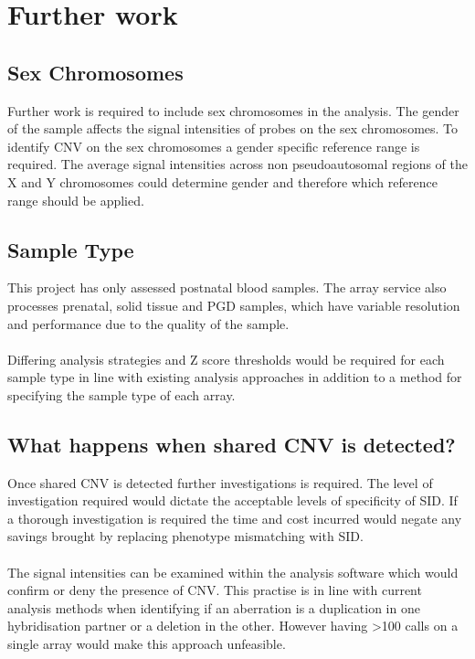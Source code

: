 \section{Further work}
\subsection{Sex Chromosomes}
Further work is required to include sex chromosomes in the analysis. The gender of the sample affects the signal intensities of probes on the sex chromosomes. To identify CNV on the sex chromosomes a gender specific reference range is required. The average signal intensities across non pseudoautosomal regions of the X and Y chromosomes could determine gender and therefore which reference range should be applied.
\subsection{Sample Type}
This project has only assessed postnatal blood samples. The array service also processes prenatal, solid tissue and \ac{PGD} samples, which have variable resolution and performance due to the quality of the sample. 
\paragraph*{}
Differing analysis strategies and Z score thresholds would be required for each sample type in line with existing analysis approaches in addition to a method for specifying the sample type of each array.
\subsection{What happens when shared CNV is detected?}
Once shared CNV is detected further investigations is required. The level of investigation required would dictate the acceptable levels of specificity of SID. If a thorough investigation is required the time and cost incurred would negate any savings brought by replacing phenotype mismatching with SID.
\paragraph*{}
The signal intensities can be examined within the analysis software which would confirm or deny the presence of CNV. This practise is in line with current analysis methods when identifying if an aberration is a duplication in one hybridisation partner or a deletion in the other. However having \textgreater 100 calls on a single array would make this approach unfeasible.
